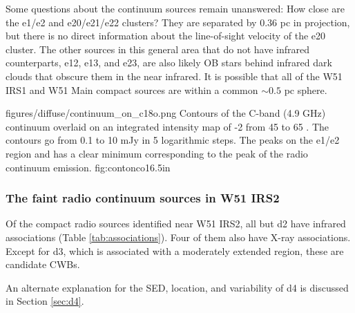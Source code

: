Some questions about the continuum sources remain unanswered: How close are the
e1/e2 and e20/e21/e22 clusters?  They are separated by 0.36 pc in projection,
but there is no direct information about the line-of-sight velocity of the e20
cluster.    The other sources in this general area that do not have infrared
counterparts, e12, e13, and e23, are also likely OB stars behind
infrared dark clouds that obscure them in the near infrared.  It is possible that
all of the W51 IRS1 and W51 Main compact sources are within a common $\sim
0.5$ pc sphere.


\Figure
{figures/diffuse/continuum_on_c18o.png}
{Contours of the C-band (4.9 GHz) continuum overlaid on an integrated intensity
map of -2 from 45 to 65 \kms \citep{Parsons2012a}.  The contours
go from 0.1 to 10 mJy in 5 logarithmic steps.  The \ceighteeno peaks on the
e1/e2 region and has a clear minimum corresponding to the peak of the radio
continuum emission.
}
{fig:contonco}{1}{6.5in}

\subsubsection{The faint radio continuum sources in W51 IRS2}
\label{sec:faintw51irs2}

Of the compact radio sources identified near W51 IRS2, all but d2 have infrared
associations (Table \ref{tab:associations}).  Four of them also have X-ray
associations.  Except for d3, which is associated with a moderately
extended \hii region, these are candidate CWBs.

An alternate explanation for the SED, location, and variability of d4 is
discussed in Section \ref{sec:d4}.



